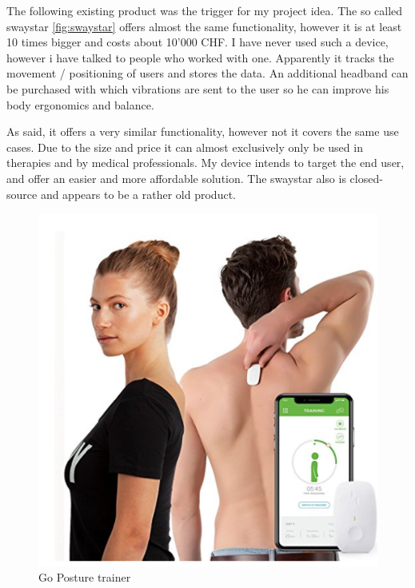 The following existing product was the trigger for my project idea. The so called swaystar \ref{fig:swaystar} offers almost the same functionality, however it is at least 10 times bigger and costs about 10'000 CHF. 
I have never used such a device, however i have talked to people who worked with one. Apparently it tracks the movement / positioning of users and stores the data. An additional headband can be purchased with which vibrations are sent to the user so he can improve his body ergonomics and balance. 

As said, it offers a very similar functionality, however not it covers the same use cases. Due to the size and price it can almost exclusively only be used in therapies and by medical professionals. My device intends to target the end user, and offer an easier and more affordable solution. The swaystar also is closed-source and appears to be a rather old product.
\cite{SwayStar47:online}

\newpage

\begin{figure}
  \begin{center}
  \vspace{-20pt}
\includegraphics[width=\linewidth]{images/Screenshot_3.png}
  \end{center}
  \vspace{-10pt}
  \caption{Go Posture trainer}
  \label{fig:gotrainer}
  \vspace{-10pt}
\end{figure}

